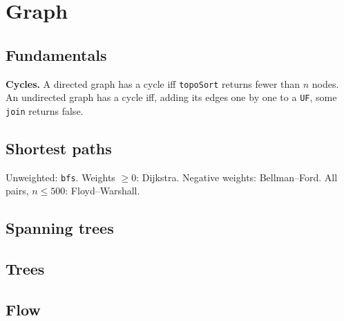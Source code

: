 \chapter{Graph}

\section{Fundamentals}
	\textbf{Cycles.} A directed graph has a cycle iff \texttt{topoSort} returns fewer than $n$ nodes.
	An undirected graph has a cycle iff, adding its edges one by one to a \texttt{UF}, some \texttt{join} returns false.

\section{Shortest paths}
	Unweighted: \texttt{bfs}. Weights $\ge 0$: Dijkstra. Negative weights: Bellman--Ford.
	All pairs, $n \le 500$: Floyd--Warshall.
	\columnbreak %

\section{Spanning trees}

\section{Trees}

\section{Flow}
